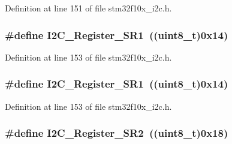 Definition at line 151 of file stm32f10x\+\_\+i2c.\+h.

\subsubsection[{\texorpdfstring{I2\+C\+\_\+\+Register\+\_\+\+S\+R1}{I2C_Register_SR1}}]{\setlength{\rightskip}{0pt plus 5cm}\#define I2\+C\+\_\+\+Register\+\_\+\+S\+R1~(({\bf uint8\+\_\+t})0x14)}\hypertarget{group___i2_c__registers_gaf3bc5f4dc87513e2eceba4f503c14d6a}{}\label{group___i2_c__registers_gaf3bc5f4dc87513e2eceba4f503c14d6a}


Definition at line 153 of file stm32f10x\+\_\+i2c.\+h.

\subsubsection[{\texorpdfstring{I2\+C\+\_\+\+Register\+\_\+\+S\+R1}{I2C_Register_SR1}}]{\setlength{\rightskip}{0pt plus 5cm}\#define I2\+C\+\_\+\+Register\+\_\+\+S\+R1~(({\bf uint8\+\_\+t})0x14)}\hypertarget{group___i2_c__registers_gaf3bc5f4dc87513e2eceba4f503c14d6a}{}\label{group___i2_c__registers_gaf3bc5f4dc87513e2eceba4f503c14d6a}


Definition at line 153 of file stm32f10x\+\_\+i2c.\+h.

\subsubsection[{\texorpdfstring{I2\+C\+\_\+\+Register\+\_\+\+S\+R2}{I2C_Register_SR2}}]{\setlength{\rightskip}{0pt plus 5cm}\#define I2\+C\+\_\+\+Register\+\_\+\+S\+R2~(({\bf uint8\+\_\+t})0x18)}\hypertarget{group___i2_c__registers_ga0b5f7949e449223ec97e0169d79d007d}{}\label{group___i2_c__registers_ga0b5f7949e449223ec97e0169d79d007d}


